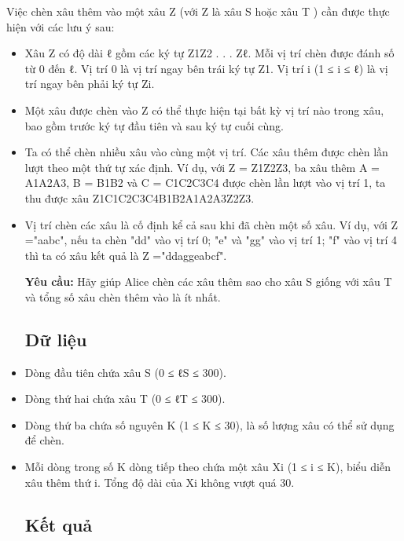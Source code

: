 Việc chèn xâu thêm vào một xâu {Z }(với {Z }là xâu {S }hoặc xâu {T })
cần được thực hiện với các lưu ý sau:

\hfill\break

\begin{itemize}
\item
  {Xâu }Z {có độ dài }ℓ {gồm các ký tự }Z{1}Z{2}{ }. . . Z{ℓ}{. Mỗi vị
  trí chèn được đánh số từ }{0 }{đến }ℓ{. Vị trí }{0 }{là vị trí ngay
  bên trái ký tự }Z{1}{. Vị trí }i {(}{1 }{≤ }i {≤ }ℓ{) là vị trí ngay
  bên phải ký tự }Z{i}{.}
\item
  Một xâu được chèn vào {Z }có thể thực hiện tại bất kỳ vị trí nào trong
  xâu, bao gồm trước ký tự đầu tiên và sau ký tự cuối cùng.
\item
  {Ta có thể chèn nhiều xâu vào cùng một vị trí. Các xâu thêm được chèn
  lần lượt theo một thứ tự xác định. Ví dụ, với }Z {= }Z{1}Z{2}Z{3}{, ba
  xâu thêm }A {= }A{1}A{2}A{3}{, }B {= }B{1}B{2}{ }{và }C {=
  }C{1}C{2}C{3}C{4}{ }{được chèn lần lượt vào vị trí 1, ta thu được xâu
  }Z{1}C{1}C{2}C{3}C{4}B{1}B{2}A{1}A{2}A{3}Z{2}Z{3}{.}
\item
  Vị trí chèn các xâu là cố định kể cả sau khi đã chèn một số xâu. Ví
  dụ, với {Z }{=}"aabc", nếu ta chèn "dd" vào vị trí {0}; "e" và "gg"
  vào vị trí {1}; "f" vào vị trí {4 }thì ta có xâu kết quả là {Z
  }{=}"ddaggeabcf".

  \hfill\break

  \textbf{Yêu cầu:} Hãy giúp Alice chèn các xâu thêm sao cho xâu {S
  }giống với xâu {T }và tổng số xâu chèn thêm vào là ít nhất.

  \subsection{Dữ liệu}\label{dux1eef-liux1ec7u}

  \hfill\break
\item
  {Dòng đầu tiên chứa xâu }S {(}{0 }{≤ }ℓ{S} {≤ }{300}{).}
\item
  {Dòng thứ hai chứa xâu }T {(}{0 }{≤ }ℓ{T} {≤ }{300}{).}
\item
  Dòng thứ ba chứa số nguyên {K }({1 }{≤ }{K }{≤ }{30}), là số lượng xâu
  có thể sử dụng để chèn.
\item
  {Mỗi dòng trong số }K {dòng tiếp theo chứa một xâu }X{i} {(}{1 }{≤ }i
  {≤ }K{), biểu diễn xâu thêm thứ }i{. Tổng độ dài của }X{i} {không vượt
  quá 30.}

  \hfill\break

  \subsection{Kết quả}\label{kux1ebft-quux1ea3}


\end{itemize}
